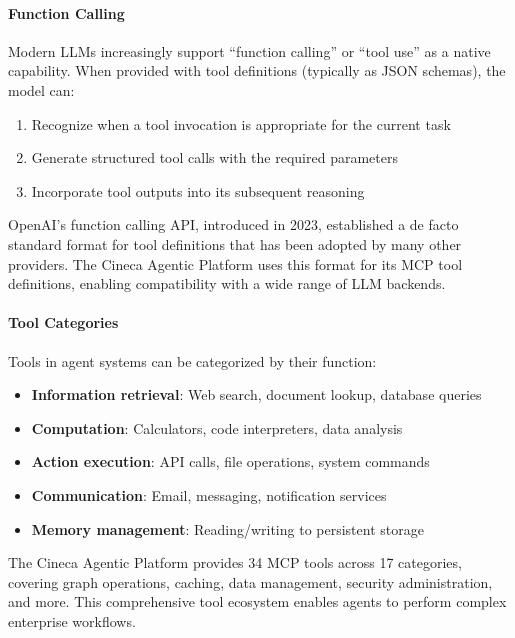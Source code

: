 \paragraph{Function Calling}
Modern LLMs increasingly support ``function calling'' or ``tool use'' as a native capability. When provided with tool definitions (typically as JSON schemas), the model can:
\begin{enumerate}
    \item Recognize when a tool invocation is appropriate for the current task
    \item Generate structured tool calls with the required parameters
    \item Incorporate tool outputs into its subsequent reasoning
\end{enumerate}

OpenAI's function calling API, introduced in 2023, established a de facto standard format for tool definitions that has been adopted by many other providers. The Cineca Agentic Platform uses this format for its MCP tool definitions, enabling compatibility with a wide range of LLM backends.

\paragraph{Tool Categories}
Tools in agent systems can be categorized by their function:
\begin{itemize}
    \item \textbf{Information retrieval}: Web search, document lookup, database queries
    \item \textbf{Computation}: Calculators, code interpreters, data analysis
    \item \textbf{Action execution}: API calls, file operations, system commands
    \item \textbf{Communication}: Email, messaging, notification services
    \item \textbf{Memory management}: Reading/writing to persistent storage
\end{itemize}

The Cineca Agentic Platform provides 34 MCP tools across 17 categories, covering graph operations, caching, data management, security administration, and more. This comprehensive tool ecosystem enables agents to perform complex enterprise workflows.

